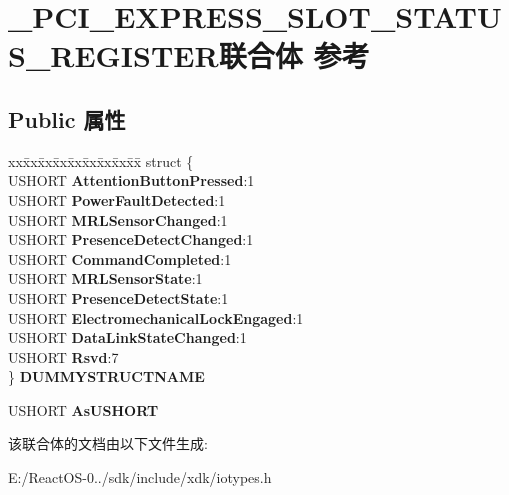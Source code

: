 \hypertarget{union___p_c_i___e_x_p_r_e_s_s___s_l_o_t___s_t_a_t_u_s___r_e_g_i_s_t_e_r}{}\section{\+\_\+\+P\+C\+I\+\_\+\+E\+X\+P\+R\+E\+S\+S\+\_\+\+S\+L\+O\+T\+\_\+\+S\+T\+A\+T\+U\+S\+\_\+\+R\+E\+G\+I\+S\+T\+E\+R联合体 参考}
\label{union___p_c_i___e_x_p_r_e_s_s___s_l_o_t___s_t_a_t_u_s___r_e_g_i_s_t_e_r}
\subsection*{Public 属性}
\begin{DoxyCompactItemize}
\item 
\mbox{\label{union___p_c_i___e_x_p_r_e_s_s___s_l_o_t___s_t_a_t_u_s___r_e_g_i_s_t_e_r_a07148079b5072878d8fb81a40aa74335}} 
\begin{tabbing}
xx\=xx\=xx\=xx\=xx\=xx\=xx\=xx\=xx\=\kill
struct \{\\
\>USHORT {\bfseries AttentionButtonPressed}:1\\
\>USHORT {\bfseries PowerFaultDetected}:1\\
\>USHORT {\bfseries MRLSensorChanged}:1\\
\>USHORT {\bfseries PresenceDetectChanged}:1\\
\>USHORT {\bfseries CommandCompleted}:1\\
\>USHORT {\bfseries MRLSensorState}:1\\
\>USHORT {\bfseries PresenceDetectState}:1\\
\>USHORT {\bfseries ElectromechanicalLockEngaged}:1\\
\>USHORT {\bfseries DataLinkStateChanged}:1\\
\>USHORT {\bfseries Rsvd}:7\\
\} {\bfseries DUMMYSTRUCTNAME}\\

\end{tabbing}\item 
\mbox{\label{union___p_c_i___e_x_p_r_e_s_s___s_l_o_t___s_t_a_t_u_s___r_e_g_i_s_t_e_r_a6da219fcc4c800874ca718ac400f7495}} 
U\+S\+H\+O\+RT {\bfseries As\+U\+S\+H\+O\+RT}
\end{DoxyCompactItemize}


该联合体的文档由以下文件生成\+:\begin{DoxyCompactItemize}
\item 
E\+:/\+React\+O\+S-\/0../sdk/include/xdk/iotypes.\+h\end{DoxyCompactItemize}
